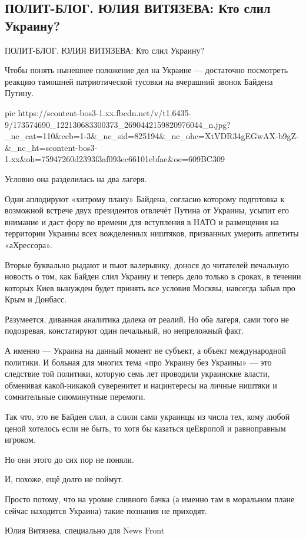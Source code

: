  
 
 
 
 
\subsection{ПОЛИТ-БЛОГ. ЮЛИЯ ВИТЯЗЕВА:  Кто слил Украину?}

ПОЛИТ-БЛОГ. ЮЛИЯ ВИТЯЗЕВА:  Кто слил Украину?

Чтобы понять нынешнее положение дел на Украине — достаточно посмотреть реакцию
тамошней патриотической тусовки на вчерашний звонок Байдена Путину.


\ifcmt
  pic https://scontent-bos3-1.xx.fbcdn.net/v/t1.6435-9/173574690_122130683300373_2690442159820976044_n.jpg?_nc_cat=110&ccb=1-3&_nc_sid=825194&_nc_ohc=XtVDR34gEGwAX-b9gZ-&_nc_ht=scontent-bos3-1.xx&oh=75947260d2393f3af093ec66101ebfae&oe=609BC309
\fi


Условно она разделилась на два лагеря.

Одни аплодируют «хитрому плану» Байдена, согласно которому подготовка к
возможной встрече двух президентов отвлечёт Путина от Украины, усыпит его
внимание и даст фору во времени для вступления в НАТО и размещения на
территории Украины всех вожделенных ништяков, призванных умерить аппетиты
«аХрессора».

Вторые буквально рыдают и пьют валерьянку, донося до читателей печальную
новость о том, как Байден слил Украину и теперь дело только в сроках, в течении
которых Киев вынужден будет принять все условия Москвы, навсегда забыв про Крым
и Донбасс.

Разумеется, диванная аналитика далека от реалий. Но оба лагеря, сами того не
подозревая, констатируют один печальный, но непреложный факт.

А именно — Украина на данный момент не субъект, а объект международной
политики. И больная для многих тема «про Украину без Украины» — это следствие
той политики, которую семь лет проводили украинские власти, обменивая
какой-никакой суверенитет и нацинтересы на личные ништяки и сомнительные
сиюминутные перемоги.

Так что, это не Байден слил, а слили сами украинцы из числа тех, кому любой
ценой хотелось если не быть, то хотя бы казаться цеЕвропой и равноправным
игроком.

Но они этого до сих пор не поняли.

И, похоже, ещё долго не поймут.

Просто потому, что на уровне сливного бачка (а именно там в моральном плане
сейчас находится Украина) такие познания не приходят.

Юлия Витязева, специально для News Front
